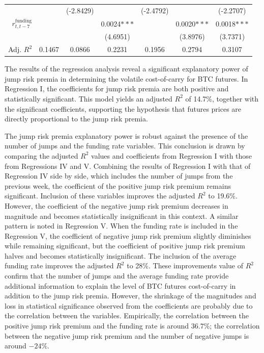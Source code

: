 \documentclass[11pt,a4paper]{article}
\numberwithin{equation}{section}
\theoremstyle{remark}
\theoremstyle{definition}
\begin{document}
\begin{table}[!t]
\begin{center}
{\begin{tabular}{rSSSSSS}
            &              &     (-2.8429) &              &    (-2.4792) &              &    (-2.2707) \\
$r^{\text{funding}}_{t,t-7}$          &              &               &  0.0024$***$ &              &  0.0020$***$ &  0.0018$***$ \\
            &              &               &     (4.6951) &              &     (3.8976) &     (3.7371) \\
\midrule
Adj. $R^2$ & 0.1467 & 0.0866 & 0.2231 & 0.1956 & 0.2794 & 0.3107\\\bottomrule
\end{tabular}
    }
    \end{center}
    \label{tab:BTCfutures_regression}
\end{table}

The results of the regression analysis reveal a significant explanatory power of jump risk premia in determining the volatile cost-of-carry for BTC futures.
In Regression I, the coefficients for jump risk premia are both positive and statistically significant.
This model yields an adjusted $R^2$ of 14.7\%, together with the significant coefficients, supporting the hypothesis that futures prices are directly proportional to the jump risk premia.

The jump risk premia explanatory power is robust against the presence of the number of jumps and the funding rate variables.
This conclusion is drawn by comparing the adjusted $R^2$ values and coefficients from Regression I with those from Regressions IV and V.
Combining the results of Regression I with that of Regression IV side by side, which includes the number of jumps from the previous week, the coefficient of the positive jump risk premium remains significant.
Inclusion of these variables improves the adjusted $R^2$ to 19.6\%.
However, the coefficient of the negative jump risk premium decreases in magnitude and becomes statistically insignificant in this context.
A similar pattern is noted in Regression V.
When the funding rate is included in the Regression V, the coefficient of negative jump risk premium slightly diminishes while remaining significant, but
the coefficient of positive jump risk premium halves and becomes statistically insignificant.
The inclusion of the average funding rate improves the adjusted $R^2$ to 28\%.
These improvements value of $R^2$ confirm that the number of jumps and the average funding rate provide additional information to explain the level of BTC futures cost-of-carry in addition to the jump risk premia.
However, the shrinkage of the magnitudes and loss in statistical significance observed from the coefficients are probably due to the correlation between the variables.
Empirically, the correlation between the positive jump risk premium and the funding rate is around $36.7\%$; the correlation between the negative jump risk premium and the number of negative jumps is around $-24\%$.
\end{document}

